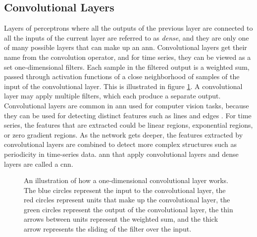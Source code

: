 \subsection{Convolutional Layers}
Layers of perceptrons where all the outputs of the previous layer are connected to all the inputs of the current layer are referred to as \textit{dense}, and they are only one of many possible layers that can make up an \acrshort{ann}. Convolutional layers get their name from the convolution operator, and for time series, they can be viewed as a set one-dimensional filters. Each sample in the filtered output is a weighted sum, passed through activation functions of a close neighborhood of samples of the input of the convolutional layer. This is illustrated in figure \ref{fig:conv}. A convolutional layer may apply multiple filters, which each produce a separate output. Convolutional layers are common in \acrshort{ann} used for computer vision tasks, because they can be used for detecting distinct features such as lines and edges \cite{dl_book}. For time series, the features that are extracted could be linear regions, exponential regions, or zero gradient regions. As the network gets deeper, the features extracted by convolutional layers are combined to detect more complex structures such as periodicity in time-series data. \acrshort{ann} that apply convolutional layers and dense layers are called a \acrfull{cnn}.

\begin{figure}
    \centering
    
    \caption{An illustration of how a one-dimensional convolutional layer works. The blue circles represent the input to the convolutional layer, the red circles represent units that make up the convolutional layer, the green circles represent the output of the convolutional layer, the thin arrows between units represent the weighted sum, and the thick arrow represents the sliding of the filter over the input.}
    \label{fig:conv}
\end{figure}

